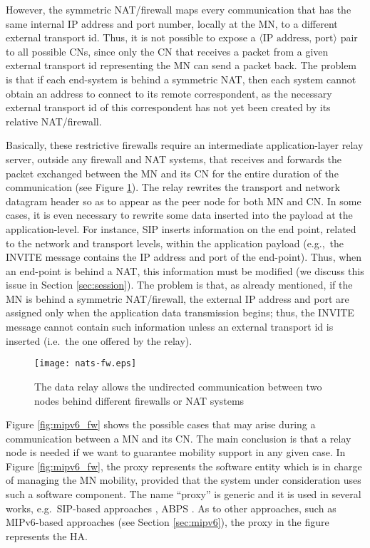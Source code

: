 \documentclass[preprint,12pt]{elsarticle}
\begin{document}
However, the symmetric NAT/firewall maps every communication that has the same internal IP address and port number, locally at the MN, to a different external transport id. 
Thus, it is not possible to expose a $\langle\text{IP address, port}\rangle$ 
pair to all possible CNs, since
only the CN that receives a packet from a given external transport id representing 
the MN can send a packet back. 
The problem is that if each end-system is behind a symmetric NAT, then 
each system cannot obtain an address to connect to its remote correspondent, as the necessary external transport id of this correspondent has not yet been created by its relative NAT/firewall.

Basically, these restrictive firewalls require an intermediate 
application-layer relay server, outside any firewall and NAT systems, that 
receives and forwards the packet exchanged between the MN and its CN for the 
entire duration of the communication (see Figure \ref{fig:nat}). The relay 
rewrites the transport and network datagram header so as to appear as the peer 
node for both MN and CN.
In some cases, it is even necessary to rewrite some data inserted 
into the payload at the application-level. 
For instance, SIP inserts information on the end point, related to the network and transport levels, within the application payload (e.g.,~the INVITE message 
contains the IP address and port of the end-point). Thus, when an end-point is 
behind a NAT, this information must be modified (we discuss this issue in Section \ref{sec:session}). 
The problem is that, as already mentioned, if the MN is behind a symmetric NAT/firewall, 
the external IP address and port are assigned only when the application data transmission begins; 
thus, the INVITE message cannot contain such information
unless an external transport id is inserted (i.e.~the one offered by the relay).

\begin{figure}[h]
   \centering
   \texttt{[image: nats-fw.eps]}
   \caption{The data relay allows the undirected communication between two nodes 
behind different firewalls or NAT systems}
   \label{fig:nat}
\end{figure}

Figure \ref{fig:mipv6_fw} shows the possible cases that may arise during a 
communication between a MN and its CN. 
The main conclusion is that a relay node is needed if we want to guarantee mobility support in any given case. In Figure \ref{fig:mipv6_fw}, the proxy represents the software entity which is in charge of managing the MN mobility, provided that the system under consideration uses such a software component. 
The name ``proxy'' is generic and it is used in several works, e.g.~SIP-based 
approaches \cite{RFC3261,Bellavista:2010,Kalmanek:2006,Schulzrinne:2000,
Udugama:2007}, ABPS \cite{GhiniJSS}. As to other approaches, such as MIPv6-based approaches (see Section \ref{sec:mipv6}), the proxy in 
the figure represents the \acf{HA}.
\end{document}
